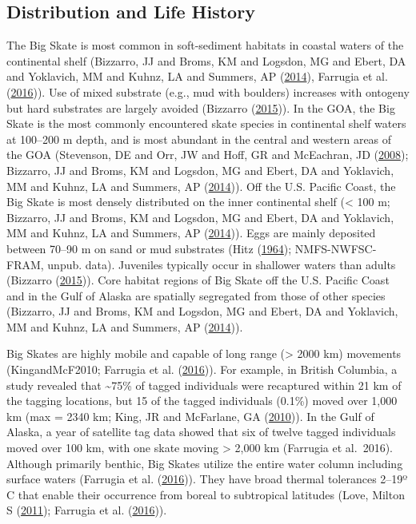 \documentclass[12pt,]{article}
\begin{document}
\hypertarget{distribution-and-life-history}{%
\subsection{Distribution and Life
History}\label{distribution-and-life-history}}

The Big Skate is most common in soft-sediment habitats in coastal waters
of the continental shelf (Bizzarro, JJ and Broms, KM and Logsdon, MG and
Ebert, DA and Yoklavich, MM and Kuhnz, LA and Summers, AP
(\protect\hyperlink{ref-Bizzarro2014}{2014}), Farrugia et al.
(\protect\hyperlink{ref-Farrugia2016}{2016})). Use of mixed substrate
(e.g., mud with boulders) increases with ontogeny but hard substrates
are largely avoided (Bizzarro
(\protect\hyperlink{ref-Bizzarro2015}{2015})). In the GOA, the Big Skate
is the most commonly encountered skate species in continental shelf
waters at 100--200 m depth, and is most abundant in the central and
western areas of the GOA (Stevenson, DE and Orr, JW and Hoff, GR and
McEachran, JD (\protect\hyperlink{ref-Stevenson2008}{2008}); Bizzarro,
JJ and Broms, KM and Logsdon, MG and Ebert, DA and Yoklavich, MM and
Kuhnz, LA and Summers, AP (\protect\hyperlink{ref-Bizzarro2014}{2014})).
Off the U.S. Pacific Coast, the Big Skate is most densely distributed on
the inner continental shelf (\textless{} 100 m; Bizzarro, JJ and Broms,
KM and Logsdon, MG and Ebert, DA and Yoklavich, MM and Kuhnz, LA and
Summers, AP (\protect\hyperlink{ref-Bizzarro2014}{2014})). Eggs are
mainly deposited between 70--90 m on sand or mud substrates (Hitz
(\protect\hyperlink{ref-Hitz1964}{1964}); NMFS-NWFSC-FRAM, unpub. data).
Juveniles typically occur in shallower waters than adults (Bizzarro
(\protect\hyperlink{ref-Bizzarro2015}{2015})). Core habitat regions of
Big Skate off the U.S. Pacific Coast and in the Gulf of Alaska are
spatially segregated from those of other species (Bizzarro, JJ and
Broms, KM and Logsdon, MG and Ebert, DA and Yoklavich, MM and Kuhnz, LA
and Summers, AP (\protect\hyperlink{ref-Bizzarro2014}{2014})).

Big Skates are highly mobile and capable of long range (\textgreater{}
2000 km) movements (KingandMcF2010; Farrugia et al.
(\protect\hyperlink{ref-Farrugia2016}{2016})). For example, in British
Columbia, a study revealed that \textasciitilde{}75\% of tagged
individuals were recaptured within 21 km of the tagging locations, but
15 of the tagged individuals (0.1\%) moved over 1,000 km (max = 2340 km;
King, JR and McFarlane, GA
(\protect\hyperlink{ref-KingandMcF2010}{2010})). In the Gulf of Alaska,
a year of satellite tag data showed that six of twelve tagged
individuals moved over 100 km, with one skate moving \textgreater{}
2,000 km (Farrugia et al.~2016). Although primarily benthic, Big Skates
utilize the entire water column including surface waters (Farrugia et
al. (\protect\hyperlink{ref-Farrugia2016}{2016})). They have broad
thermal tolerances 2--19º C that enable their occurrence from boreal to
subtropical latitudes (Love, Milton S
(\protect\hyperlink{ref-Love2011}{2011}); Farrugia et al.
(\protect\hyperlink{ref-Farrugia2016}{2016})).
\end{document}
